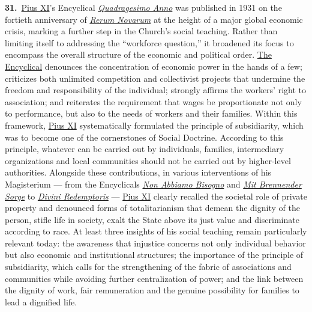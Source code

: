 \documentclass{article}
\begin{document}
\textbf{31.}\ \href{https://www.vatican.va/content/pius-xi/en.html}{Pius XI}'s Encyclical \href{https://www.vatican.va/content/pius-xi/en/encyclicals/documents/hf_p-xi_enc_19310515_quadragesimo-anno.html}{\emph{Quadragesimo Anno}} was published in 1931 on the fortieth anniversary of \href{https://www.vatican.va/content/leo-xiii/en/encyclicals/documents/hf_l-xiii_enc_15051891_rerum-novarum.html}{\emph{Rerum Novarum}} at the height of a major global economic crisis, marking a further step in the Church's social teaching. Rather than limiting itself to addressing the ``workforce question,'' it broadened its focus to encompass the overall structure of the economic and political order. \href{https://www.vatican.va/content/pius-xi/en/encyclicals/documents/hf_p-xi_enc_19310515_quadragesimo-anno.html}{The Encyclical} denounces the concentration of economic power in the hands of a few; criticizes both unlimited competition and collectivist projects that undermine the freedom and responsibility of the individual; strongly affirms the workers' right to association; and reiterates the requirement that wages be proportionate not only to performance, but also to the needs of workers and their families. Within this framework, \href{https://www.vatican.va/content/pius-xi/en.html}{Pius XI} systematically formulated the principle of subsidiarity, which was to become one of the cornerstones of Social Doctrine. According to this principle, whatever can be carried out by individuals, families, intermediary organizations and local communities should not be carried out by higher-level authorities. Alongside these contributions, in various interventions of his Magisterium --- from the Encyclicals \href{https://www.vatican.va/content/pius-xi/en/encyclicals/documents/hf_p-xi_enc_29061931_non-abbiamo-bisogno.html}{\emph{Non Abbiamo Bisogno}} and \href{https://www.vatican.va/content/pius-xi/en/encyclicals/documents/hf_p-xi_enc_14031937_mit-brennender-sorge.html}{\emph{Mit Brennender Sorge}} to \href{https://www.vatican.va/content/pius-xi/en/encyclicals/documents/hf_p-xi_enc_19370319_divini-redemptoris.html}{\emph{Divini Redemptoris}} --- \href{https://www.vatican.va/content/pius-xi/en.html}{Pius XI} clearly recalled the societal role of private property and denounced forms of totalitarianism that demean the dignity of the person, stifle life in society, exalt the State above its just value and discriminate according to race. At least three insights of his social teaching remain particularly relevant today: the awareness that injustice concerns not only individual behavior but also economic and institutional structures; the importance of the principle of subsidiarity, which calls for the strengthening of the fabric of associations and communities while avoiding further centralization of power; and the link between the dignity of work, fair remuneration and the genuine possibility for families to lead a dignified life.
\end{document}
